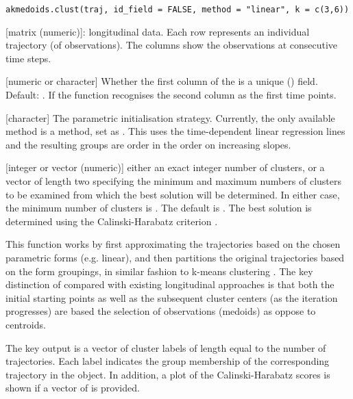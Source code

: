 \documentclass[a4paper]{book}
\begin{document}
%
\begin{Usage}
\begin{verbatim}
akmedoids.clust(traj, id_field = FALSE, method = "linear", k = c(3,6))
\end{verbatim}
\end{Usage}
%
\begin{Arguments}
\begin{ldescription}
\item[\code{traj}] [matrix (numeric)]: longitudinal data. Each row represents an individual trajectory (of observations). The columns show the observations at consecutive time steps.

\item[\code{id\_field}] [numeric or character] Whether the first column of the  is a unique () field. Default: . If  the function recognises the second column as the first time points.

\item[\code{method}] [character] The parametric initialisation strategy. Currently, the only available method is a  method, set as . This uses the time-dependent linear regression lines and the resulting groups are order in the order on increasing slopes.

\item[\code{k}] [integer or vector (numeric)] either an exact integer number of clusters, or a vector of length two specifying the minimum and maximum numbers of clusters to be examined from which the best solution will be determined. In either case, the minimum number of clusters is . The default is . The best solution is determined using the Calinski-Harabatz criterion .
\end{ldescription}
\end{Arguments}
%
\begin{Details}\relax
This function works by first approximating the trajectories based on the chosen parametric forms (e.g. linear), and then partitions the original trajectories based on the form groupings, in similar fashion to k-means clustering . The key distinction of  compared with existing longitudinal approaches is that both the initial starting points as well as the subsequent cluster centers (as the iteration progresses) are based the selection of observations (medoids) as oppose to centroids.
\end{Details}
%
\begin{Value}
The key output is a vector of cluster labels of length equal to the number of trajectories. Each label indicates the group membership of the corresponding trajectory in the  object. In addition, a plot of the Calinski-Harabatz scores is shown if a vector of  is provided.
\end{Value}
\end{document}
